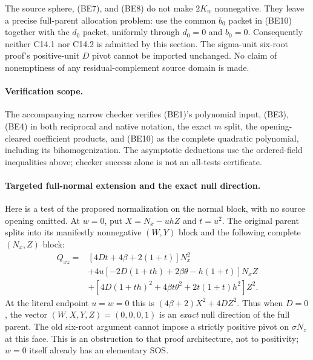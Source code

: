 The source sphere, (BE7), and (BE8) do not make $2K_w$ nonnegative.
They leave a precise full-parent allocation problem: use the common
$b_0$ packet in (BE10) together with the $d_0$ packet, uniformly through
$d_0=0$ and $b_0=0$. Consequently neither C14.1 nor C14.2 is admitted
by this section. The sigma-unit six-root proof's positive-unit $D$
pivot cannot be imported unchanged. No claim of nonemptiness of any
residual-complement source domain is made.

\paragraph{Verification scope.}
The accompanying narrow checker verifies (BE1)'s polynomial input,
(BE3), (BE4) in both reciprocal and native notation, the exact $m$
split, the opening-cleared coefficient products, and (BE10) as the
complete quadratic polynomial, including its bihomogenization.
The asymptotic deductions use the ordered-field inequalities above;
checker success alone is not an all-tests certificate.

\paragraph{Targeted full-normal extension and the exact null direction.}
Here is a test of the proposed normalization on the normal block, with
no source opening omitted. At $w=0$, put $X=N_x-uhZ$ and $t=u^2$.
The original parent splits into its manifestly nonnegative $(W,Y)$
block and the following complete $(N_x,Z)$ block:
\begin{align*}
 Q_{xz}={}&[4Dt+4\beta+2(1+t)]N_x^2\\
 &+4u[-2D(1+th)+2\beta\theta-h(1+t)]N_xZ\\
 &+[4D(1+th)^2+4\beta t\theta^2+2t(1+t)h^2]Z^2.
 \tag{BE11}
\end{align*}
At the literal endpoint $u=w=0$ this is $(4\beta+2)X^2+4DZ^2$.
Thus when $D=0$, the vector $(W,X,Y,Z)=(0,0,0,1)$ is an
\emph{exact} null direction of the full parent. The old six-root
argument cannot impose a strictly positive pivot on $\sigma N_z$
at this face. This is an obstruction to that proof architecture,
not to positivity; $w=0$ itself already has an elementary SOS.

